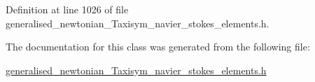Definition at line 1026 of file generalised\+\_\+newtonian\+\_\+\+Taxisym\+\_\+navier\+\_\+stokes\+\_\+elements.\+h.



The documentation for this class was generated from the following file\+:\begin{DoxyCompactItemize}
\item 
\hyperlink{generalised__newtonian__Taxisym__navier__stokes__elements_8h}{generalised\+\_\+newtonian\+\_\+\+Taxisym\+\_\+navier\+\_\+stokes\+\_\+elements.\+h}\end{DoxyCompactItemize}
